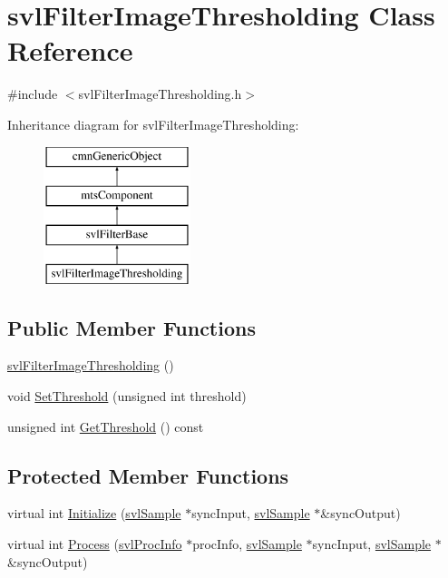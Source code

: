 \hypertarget{classsvl_filter_image_thresholding}{}\section{svl\+Filter\+Image\+Thresholding Class Reference}
\label{classsvl_filter_image_thresholding}


{\ttfamily \#include $<$svl\+Filter\+Image\+Thresholding.\+h$>$}

Inheritance diagram for svl\+Filter\+Image\+Thresholding\+:\begin{figure}[H]
\begin{center}
\leavevmode
\includegraphics[height=4.000000cm]{df/d21/classsvl_filter_image_thresholding}
\end{center}
\end{figure}
\subsection*{Public Member Functions}
\begin{DoxyCompactItemize}
\item 
\hyperlink{classsvl_filter_image_thresholding_a70b0376263985d4291c1f8b77da0b3f6}{svl\+Filter\+Image\+Thresholding} ()
\item 
void \hyperlink{classsvl_filter_image_thresholding_a562edec14a461bbeb29fffff65dff308}{Set\+Threshold} (unsigned int threshold)
\item 
unsigned int \hyperlink{classsvl_filter_image_thresholding_a6141caa0d4a23ae2039cfefbdddab07e}{Get\+Threshold} () const 
\end{DoxyCompactItemize}
\subsection*{Protected Member Functions}
\begin{DoxyCompactItemize}
\item 
virtual int \hyperlink{classsvl_filter_image_thresholding_ab90b5a7925b48010f4cf2576ca276bca}{Initialize} (\hyperlink{classsvl_sample}{svl\+Sample} $\ast$sync\+Input, \hyperlink{classsvl_sample}{svl\+Sample} $\ast$\&sync\+Output)
\item 
virtual int \hyperlink{classsvl_filter_image_thresholding_a3e21d87913f686dd80aac167fe084fc6}{Process} (\hyperlink{structsvl_proc_info}{svl\+Proc\+Info} $\ast$proc\+Info, \hyperlink{classsvl_sample}{svl\+Sample} $\ast$sync\+Input, \hyperlink{classsvl_sample}{svl\+Sample} $\ast$\&sync\+Output)
\end{DoxyCompactItemize}
